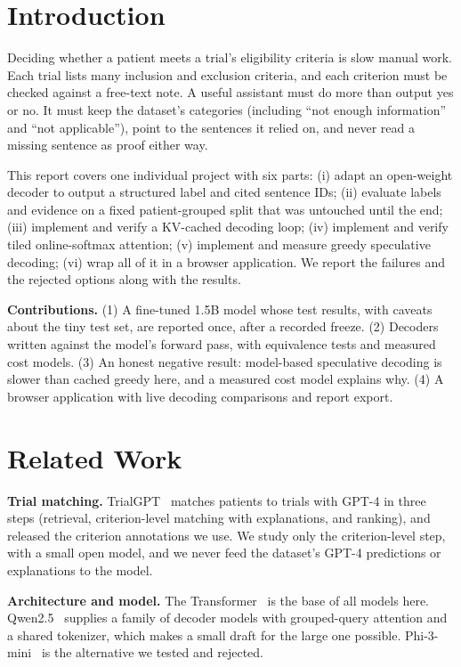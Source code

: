 \documentclass[conference]{IEEEtran}
\begin{document}
\section{Introduction}
Deciding whether a patient meets a trial's eligibility criteria is slow manual work. Each trial lists many inclusion and exclusion criteria, and each criterion must be checked against a free-text note. A useful assistant must do more than output yes or no. It must keep the dataset's categories (including ``not enough information'' and ``not applicable''), point to the sentences it relied on, and never read a missing sentence as proof either way.

This report covers one individual project with six parts: (i) adapt an open-weight decoder to output a structured label and cited sentence IDs; (ii) evaluate labels and evidence on a fixed patient-grouped split that was untouched until the end; (iii) implement and verify a KV-cached decoding loop; (iv) implement and verify tiled online-softmax attention; (v) implement and measure greedy speculative decoding; (vi) wrap all of it in a browser application. We report the failures and the rejected options along with the results.

\textbf{Contributions.} (1) A fine-tuned 1.5B model whose test results, with caveats about the tiny test set, are reported once, after a recorded freeze. (2) Decoders written against the model's forward pass, with equivalence tests and measured cost models. (3) An honest negative result: model-based speculative decoding is slower than cached greedy here, and a measured cost model explains why. (4) A browser application with live decoding comparisons and report export.

\section{Related Work}
\textbf{Trial matching.} TrialGPT~\cite{trialgpt} matches patients to trials with GPT-4 in three steps (retrieval, criterion-level matching with explanations, and ranking), and released the criterion annotations we use. We study only the criterion-level step, with a small open model, and we never feed the dataset's GPT-4 predictions or explanations to the model.

\textbf{Architecture and model.} The Transformer~\cite{attention} is the base of all models here. Qwen2.5~\cite{qwen25} supplies a family of decoder models with grouped-query attention and a shared tokenizer, which makes a small draft for the large one possible. Phi-3-mini~\cite{phi3} is the alternative we tested and rejected.
\end{document}
